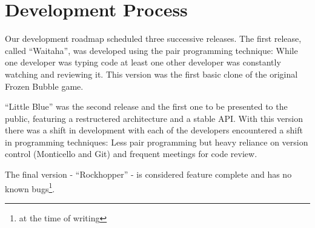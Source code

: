 \section{Development Process}
Our development roadmap scheduled three successive releases. 
The first release, called ``Waitaha'', was developed using 
the pair programming technique: While one developer was 
typing code at least one other developer was constantly 
watching and reviewing it. This version was the first 
basic clone of the original Frozen Bubble game.

``Little Blue'' was the second release and the first one 
to be presented to the public, featuring a restructered 
architecture and a stable API. With this version there was 
a shift in development with each of the developers encountered 
a shift in programming techniques: Less pair programming but heavy 
reliance on version control (Monticello and Git) and frequent 
meetings for code review.

The final version - ``Rockhopper'' - is considered feature complete and has no known bugs\footnote{at the time of writing}.
